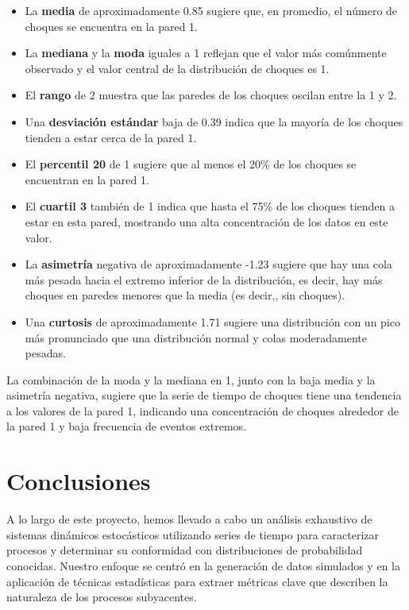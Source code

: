 \documentclass[11pt]{article} %
\begin{document}
\begin{itemize}
	\item La \textbf{media} de aproximadamente 0.85 sugiere que, en promedio, el número de choques se encuentra en la pared 1.
	\item La \textbf{mediana} y la \textbf{moda} iguales a 1 reflejan que el valor más comúnmente observado y el valor central de la distribución de choques es 1.
	\item El \textbf{rango} de 2 muestra que las paredes de los choques oscilan entre la 1 y 2.
	\item Una \textbf{desviación estándar} baja de 0.39 indica que la mayoría de los choques tienden a estar cerca de la pared 1.
	\item El \textbf{percentil 20} de 1 sugiere que al menos el 20\% de los choques se encuentran en la pared 1.
	\item El \textbf{cuartil 3} también de 1 indica que hasta el 75\% de los choques tienden a estar en esta pared, mostrando una alta concentración de los datos en este valor.
	\item La \textbf{asimetría} negativa de aproximadamente -1.23 sugiere que hay una cola más pesada hacia el extremo inferior de la distribución, es decir, hay más choques en paredes menores que la media (es decir,, sin choques).
	\item Una \textbf{curtosis} de aproximadamente 1.71 sugiere una distribución con un pico más pronunciado que una distribución normal y colas moderadamente pesadas.
\end{itemize}

La combinación de la moda y la mediana en 1, junto con la baja media y la asimetría negativa, sugiere que la serie de tiempo de choques tiene una tendencia a los valores de la pared 1, indicando una concentración de choques alrededor de la pared 1 y baja frecuencia de eventos extremos.

\newpage
\section{Conclusiones}

A lo largo de este proyecto, hemos llevado a cabo un análisis exhaustivo de sistemas dinámicos estocásticos utilizando series de tiempo para caracterizar procesos y determinar su conformidad con distribuciones de probabilidad conocidas. Nuestro enfoque se centró en la generación de datos simulados y en la aplicación de técnicas estadísticas para extraer métricas clave que describen la naturaleza de los procesos subyacentes.
\end{document}
